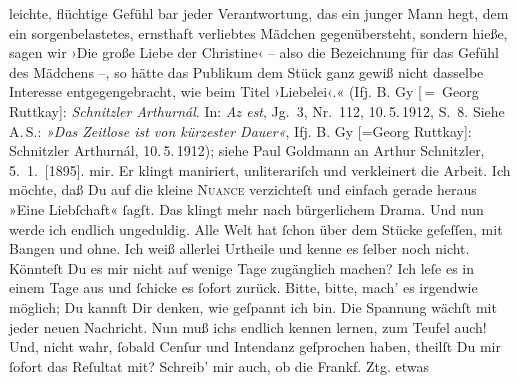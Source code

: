 \begin{ledgroupsized}[t]{13cm}
{{{                     leichte, flüchtige Gefühl bar jeder Verantwortung, das ein junger Mann hegt,
                     dem ein sorgenbelastetes, ernsthaft verliebtes Mädchen gegenübersteht, sondern
                     hieße, sagen wir ›Die große Liebe der Christine‹ – also die Bezeichnung für das
                     Gefühl des Mädchens –, so hätte das Publikum dem Stück ganz gewiß nicht
                     dasselbe Interesse entgegengebracht, wie beim Titel ›Liebelei‹.« (Ifj. B. Gy [ = Georg Ruttkay]: \emph{Schnitzler Arthurnál}. In: \emph{Az est}, Jg. 3, Nr. 112, 10. 5. 1912, S. 8. Siehe A. S.: \emph{»Das Zeitlose ist von kürzester Dauer«}, Ifj. B. Gy [=Georg Ruttkay]: Schnitzler Arthurnál, 10. 5. 1912);
                     siehe Paul Goldmann an Arthur Schnitzler, 5. 1. [1895].
               }}}\label{K_L02630-4h} mir. {\pb}Er klingt maniriert, unliterariſch und
               verkleinert die Arbeit. Ich möchte, daß Du auf die kleine \textsc{Nuance} verzichteſt und einfach gerade heraus »Eine Liebſchaft« ſagſt. Das
               klingt mehr nach bürgerlichem Drama. Und nun werde ich endlich ungeduldig. Alle Welt
               hat ſchon über dem Stücke
               geſeſſen, mit  Bangen und ohne. Ich weiß allerlei
               Urtheile und kenne es ſelber noch nicht. Könnteſt Du es mir nicht auf wenige Tage
               zugänglich machen? Ich leſe es in einem Tage aus und ſchicke es ſofort zurück. Bitte,
               bitte, mach’ es irgendwie möglich; Du kannſt Dir denken, wie geſpannt {\pb}ich bin. Die Spannung wächſt mit jeder neuen
               Nachricht. Nun muß ichs endlich kennen lernen, zum Teufel auch! Und, nicht wahr,
               ſobald Cenſur und Intendanz geſprochen haben, theilſt Du mir ſofort das Reſultat mit?
               Schreib’ mir auch, ob die Frankf. Ztg. etwas

\end{ledgroupsized}
